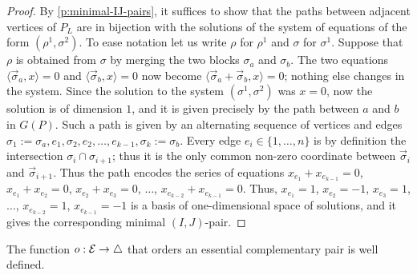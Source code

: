 \begin{proof}
    By \cref{p:minimal-IJ-pairs}, it suffices to show that the paths between adjacent vertices of $P_L$ are in bijection with the solutions of the system of equations of the form $(\rho^1,\sigma^2)$. 
    To ease notation let us write $\rho$ for $\rho^1$ and $\sigma$ for $\sigma^1$. 
    Suppose that $\rho$ is obtained from $\sigma$ by merging the two blocks $\sigma_a$ and $\sigma_b$. 
    The two equations $\langle \vec \sigma_a, x \rangle =0$ and $\langle \vec \sigma_b, x \rangle =0$ now become $\langle \vec \sigma_a + \vec \sigma_b, x \rangle =0$; nothing else changes in the system. 
    Since the solution to the system $(\sigma^1,\sigma^2)$ was $x=0$, now the solution is of dimension $1$, and it is given precisely by the path between $a$ and $b$ in $G(P)$.
    Such a path is given by an alternating sequence of vertices and edges $\sigma_1:=\sigma_a, e_1, \sigma_2, e_2, \ldots, e_{k-1}, \sigma_k:=\sigma_b$. 
    Every edge $e_i \in \{1,\ldots, n\}$ is by definition the intersection $\sigma_{i} \cap \sigma_{i+1}$; thus it is the only common non-zero coordinate between $\vec \sigma_{i}$ and $\vec \sigma_{i+1}$.
    Thus the path encodes the series of equations $x_{e_1}+x_{e_{k-1}}=0$, $x_{e_1}+x_{e_2}=0$, $x_{e_2}+x_{e_3}=0$, $\ldots$, $x_{e_{k-2}}+x_{e_{k-1}}=0$. 
    Thus, $x_{e_1}=1$, $x_{e_2}=-1$, $x_{e_3}=1$, $\ldots$, $x_{e_{k-2}}=1$, $x_{e_{k-1}}=-1$ is a basis of one-dimensional space of solutions, and it gives the corresponding minimal $(I,J)$-pair. 
\end{proof}

\begin{lemma} 
\label{o well defined}
The function $o:\mathcal{E} \to \triangle$ that orders an essential complementary pair is well defined.
\end{lemma}

